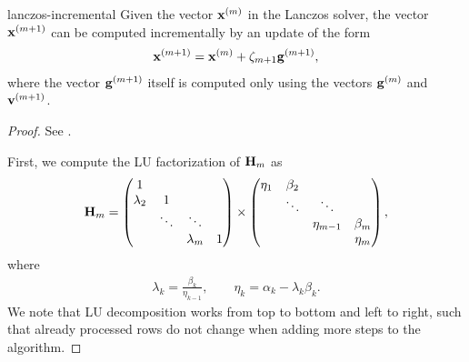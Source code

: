 \begin{Lemma}{lanczos-incremental}
  Given the vector $\mathbf x^{(m)}$ in the Lanczos solver, the vector
  $\mathbf x^{(m+1)}$ can be computed incrementally by an update of the form
  \begin{gather}
    \mathbf x^{(m+1)} = \mathbf x^{(m)} + \zeta_{m+1}\mathbf g^{(m+1)},
  \end{gather}
  where the vector $\mathbf g^{(m+1)}$ itself is computed only using the
  vectors $\mathbf g^{(m)}$ and $\mathbf v^{(m+1)}$.
\end{Lemma}

\begin{proof}
  See \cite[Section 6.7.1]{Saad00}.

  First, we compute the LU factorization of $\mathbf H_m$ as
  \begin{gather}
    \mathbf H_m =
    \begin{pmatrix}
      1\\\lambda_2&1\\
      &\ddots&\ddots\\
      &&\lambda_m&1
    \end{pmatrix}
    \times
    \begin{pmatrix}
      \eta_1&\beta_2\\
      &\ddots&\ddots\\
      &&\eta_{m-1}&\beta_m\\
      &&&\eta_m
    \end{pmatrix},
  \end{gather}
  where
  \begin{gather}
    \lambda_k = \frac{\beta_k}{\eta_{k-1}},
    \qquad
    \eta_k = \alpha_k - \lambda_k \beta_k.
  \end{gather}
  We note that LU decomposition works from top to bottom and left to
  right, such that already processed rows do not change when adding
  more steps to the algorithm.


\end{proof}
